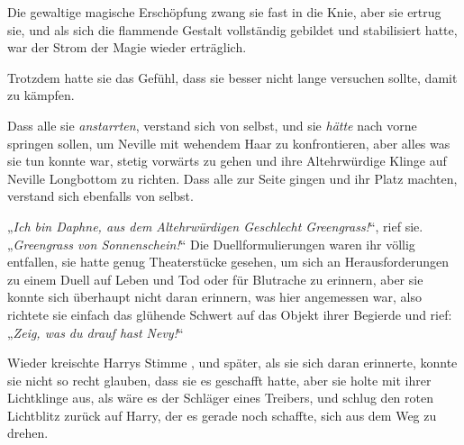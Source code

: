 Die gewaltige magische Erschöpfung zwang sie fast in die Knie, aber sie ertrug sie, und als sich die flammende Gestalt vollständig gebildet und stabilisiert hatte, war der Strom der Magie wieder erträglich.

Trotzdem hatte sie das Gefühl, dass sie besser nicht lange versuchen sollte, damit zu kämpfen.

Dass alle sie \emph{anstarrten}, verstand sich von selbst, und sie \emph{hätte} nach vorne springen sollen, um Neville mit wehendem Haar zu konfrontieren, aber alles was sie tun konnte war, stetig vorwärts zu gehen und ihre Altehrwürdige Klinge auf Neville Longbottom zu richten. Dass alle zur Seite gingen und ihr Platz machten, verstand sich ebenfalls von selbst.

„\emph{Ich bin Daphne, aus dem Altehrwürdigen Geschlecht Greengrass!}“, rief sie. „\emph{Greengrass von Sonnenschein!}“ Die Duellformulierungen waren ihr völlig entfallen, sie hatte genug Theaterstücke gesehen, um sich an Herausforderungen zu einem Duell auf Leben und Tod oder für Blutrache zu erinnern, aber sie konnte sich überhaupt nicht daran erinnern, was hier angemessen war, also richtete sie einfach das glühende Schwert auf das Objekt ihrer Begierde und rief: „\emph{Zeig, was du drauf hast Nevy!}“

Wieder kreischte Harrys Stimme , und später, als sie sich daran erinnerte, konnte sie nicht so recht glauben, dass sie es geschafft hatte, aber sie holte mit ihrer Lichtklinge aus, als wäre es der Schläger eines Treibers, und schlug den roten Lichtblitz zurück auf Harry, der es gerade noch schaffte, sich aus dem Weg zu drehen.

